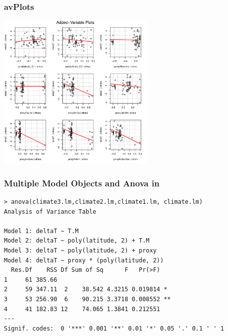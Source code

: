 \documentclass[handout]{beamer}
\begin{document}
\begin{frame}%
   \frametitle{avPlots}
 \centerline{\includegraphics[height=3in]{avplot}}
 \end{frame}
\begin{frame}[fragile]
  \frametitle{Multiple Model Objects and Anova in \R}
\begin{verbatim}
> anova(climate3.lm,climate2.lm,climate1.lm, climate.lm)
Analysis of Variance Table

Model 1: deltaT ~ T.M
Model 2: deltaT ~ poly(latitude, 2) + T.M
Model 3: deltaT ~ poly(latitude, 2) + proxy
Model 4: deltaT ~ proxy * (poly(latitude, 2))
  Res.Df    RSS Df Sum of Sq      F   Pr(>F)   
1     61 385.66                                
2     59 347.11  2    38.542 4.3215 0.019814 * 
3     53 256.90  6    90.215 3.3718 0.008552 **
4     41 182.83 12    74.065 1.3841 0.212551   
---
Signif. codes:  0 '***' 0.001 '**' 0.01 '*' 0.05 '.' 0.1 ' ' 1 
\end{verbatim}
\end{frame}
\end{document}
